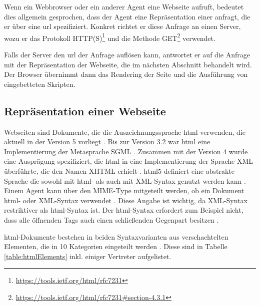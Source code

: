         Wenn ein Webbrowser oder ein anderer Agent eine Webseite aufruft,
        bedeutet dies allgemein gesprochen, dass der Agent eine Repräsentation
        einer {\resource} anfragt, die er über eine \gls{url} spezifiziert.
        Konkret richtet er diese Anfrage an einen Server,
        wozu er das Protokoll HTTP(S)\footnote{\url{https://tools.ietf.org/html/rfc7231}} und die Methode
        GET\footnote{\url{https://tools.ietf.org/html/rfc7231\#section-4.3.1}} verwendet.

        Falls der Server den \gls{url} der Anfrage auflösen kann,
        antwortet er auf die Anfrage mit der Repräsentation der Webseite,
        die im nächsten Abschnitt behandelt wird.
        Der Browser übernimmt dann das Rendering der Seite und die Ausführung
        von eingebetteten Skripten.

        \subsection{Repräsentation einer Webseite}
            Webseiten sind Dokumente, die die Auszeichnungssprache \gls{html} verwenden,
            die aktuell in der Version 5 vorliegt \cite{w3c:html5}.
            Bis zur Version 3.2 war \gls{html} eine Implementierung der Metasprache SGML \cite[Kapitel 3]{w3c:html401}.
            Zusammen mit der Version 4 wurde eine Ausprägung spezifiziert,
            die \gls{html} in eine Implementierung der Sprache XML überführte,
            die den Namen XHTML erhielt \cite{w3c:xhtml}.
            \gls{html}5 definiert eine abstrakte Sprache
            die sowohl mit \gls{html}- als auch mit XML-Syntax genutzt werden kann
            \cite[Kapitel 1.6]{w3c:html5}.
            Einem Agent kann über den MIME-Type mitgeteilt werden,
            ob ein Dokument \gls{html}- oder XML-Syntax verwendet \cite[Kapitel 1.6]{w3c:html5}.
            Diese Angabe ist wichtig, da XML-Syntax restriktiver als \gls{html}-Syntax ist.
            Der \gls{html}-Syntax erfordert zum Beispiel nicht,
            dass alle öffnenden Tags auch einen schließenden Gegenpart besitzen
            \cite[Kapitel 3.2.3]{w3c:html5}.

            \gls{html}-Dokumente bestehen in beiden Syntaxvarianten aus verschachtelten
            Elementen, die in 10 Kategorien eingeteilt werden \cite[Kapitel 4]{w3c:html5}.
            Diese sind in Tabelle \ref{table:htmlElements} inkl. einiger Vertreter aufgelistet.

